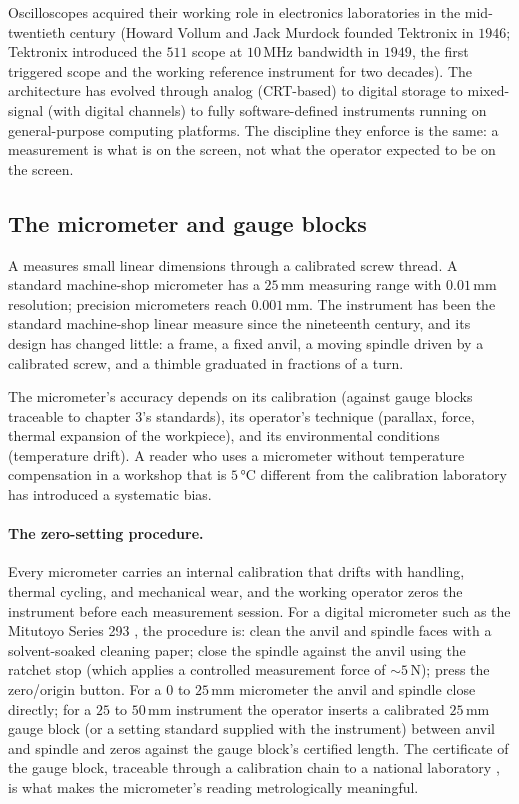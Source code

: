 Oscilloscopes acquired their working role in electronics
laboratories in the mid-twentieth century (Howard Vollum and
Jack Murdock founded Tektronix in $1946$; Tektronix introduced
the $511$ scope at $10\,\si{\mega\hertz}$ bandwidth in $1949$,
the first triggered scope and the working reference instrument
for two decades). The architecture has evolved through analog
(CRT-based) to digital storage to mixed-signal (with digital
channels) to fully software-defined instruments running on
general-purpose computing platforms. The discipline they
enforce is the same: a measurement is what is on the screen,
not what the operator expected to be on the screen.

\subsection{The micrometer and gauge blocks}

A  measures small linear dimensions through a
calibrated screw thread. A standard machine-shop micrometer has a
$25 \,\si{\milli\meter}$ measuring range with $0.01 \,\si{\milli
\meter}$ resolution; precision micrometers reach $0.001 \,\si
{\milli\meter}$. The instrument has been the standard machine-shop
linear measure since the nineteenth century, and its design has
changed little: a frame, a fixed anvil, a moving spindle driven by
a calibrated screw, and a thimble graduated in fractions of a
turn.

The micrometer's accuracy depends on its calibration (against gauge
blocks traceable to chapter 3's standards), its operator's
technique (parallax, force, thermal expansion of the workpiece),
and its environmental conditions (temperature drift). A reader who
uses a micrometer without temperature compensation in a workshop
that is $5 \,\si{\degreeCelsius}$ different from the calibration
laboratory has introduced a systematic bias.

\paragraph{The zero-setting procedure.} Every micrometer carries an
internal calibration that drifts with handling, thermal cycling, and
mechanical wear, and the working operator zeros the instrument
before each measurement session. For a digital micrometer such as
the Mitutoyo Series 293 \cite{text:ch05t3-mitutoyo-293-datasheet},
the procedure is: clean the anvil and spindle faces with a
solvent-soaked cleaning paper; close the spindle against the anvil
using the ratchet stop (which applies a controlled measurement
force of $\sim 5 \,\si{\newton}$); press the zero/origin button.
For a $0$ to $25 \,\si{\milli\meter}$ micrometer the anvil and
spindle close directly; for a $25$ to $50 \,\si{\milli\meter}$
instrument the operator inserts a calibrated $25 \,\si{\milli
\meter}$ gauge block (or a setting standard supplied with the
instrument) between anvil and spindle and zeros against the gauge
block's certified length. The certificate of the gauge block,
traceable through a calibration chain to a national laboratory
\cite{text:doiron-beers-2009}, is what makes the micrometer's
reading metrologically meaningful.

